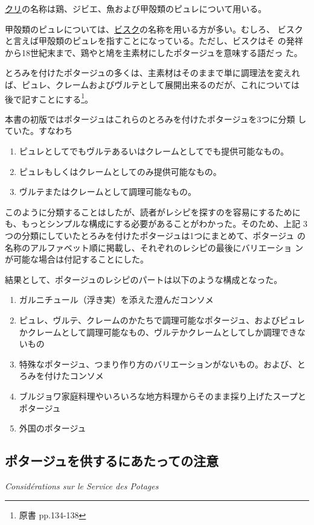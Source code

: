 \ul{クリ}の名称は鶏、ジビエ、魚および甲殻類のピュレについて用いる。

甲殻類のピュレについては、\ul{ビスク}の名称を用いる方が多い。むしろ、
ビスクと言えば甲殻類のピュレを指すことになっている。ただし、ビスクはそ
の発祥から18世紀末まで、鶏やと鳩を主素材にしたポタージュを意味する語だっ
た。

とろみを付けたポタージュの多くは、主素材はそのままで単に調理法を変えれ
ば、ピュレ、クレームおよびヴルテとして展開出来るのだが、これについては
後で記すことにする\footnote{原書 pp.134-138}。

本書の初版ではポタージュはこれらのとろみを付けたポタージュを3つに分類
していた。すなわち

\begin{enumerate}
\def\labelenumi{\arabic{enumi}.}
\item
  ピュレとしてでもヴルテあるいはクレームとしてでも提供可能なもの。
\item
  ピュレもしくはクレームとしてのみ提供可能なもの。
\item
  ヴルテまたはクレームとして調理可能なもの。
\end{enumerate}

このように分類することはしたが、読者がレシピを探すのを容易にするために
も、もっとシンプルな構成にする必要があることがわかった。そのため、上記
3つの分類にしていたとろみを付けたポタージュは1つにまとめて、ポタージュ
の名称のアルファベット順に掲載し、それぞれのレシピの最後にバリエーショ
ンが可能な場合は付記することにした。

結果として、ポタージュのレシピのパートは以下のような構成となった。

\begin{enumerate}
\def\labelenumi{\arabic{enumi}.}
\item
  ガルニチュール（浮き実）を添えた澄んだコンソメ
\item
  ピュレ、ヴルテ、クレームのかたちで調理可能なポタージュ、およびピュレかクレームとして調理可能なもの、ヴルテかクレームとしてしか調理できないもの
\item
  特殊なポタージュ、つまり作り方のバリエーションがないもの。および、とろみを付けたコンソメ
\item
  ブルジョワ家庭料理やいろいろな地方料理からそのまま採り上げたスープとポタージュ
\item
  外国のポタージュ
\end{enumerate}

\hypertarget{consideration-sur-le-service-des-potages}{%
\subsection{ポタージュを供するにあたっての注意}\label{consideration-sur-le-service-des-potages}}

\vspace{-1\zw} \begin{center}
\hspace{1\zw}\large\textit{Considérations sur le Service des Potages}
\normalsize \end{center}
